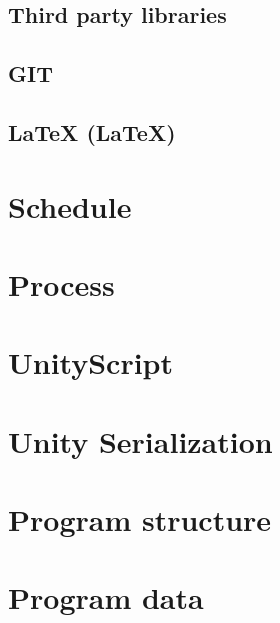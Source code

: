 \documentclass[BSP,english,oneside]{classes/gucthesis}
\begin{document}
		\subsection{Third party libraries}
			\label{subsec:third_party_libraries}
			
			
		\subsection{GIT}
			\label{subsec:git}
			

		\subsection{LaTeX (\LaTeX{})}
			\label{subsec:latex}
			


	\section{Schedule}
		\label{sec:schedule}
		

	\section{Process}
		\label{sec:process}
		

	\section{UnityScript}
		\label{sec:UnityScript}
		

	\section{Unity Serialization}
		\label{sec:UnitySerialization}
		

	\section{Program structure}
		\label{sec:program_structure}
		

	\section{Program data}
		\label{sec:program_data}
		
\end{document}
